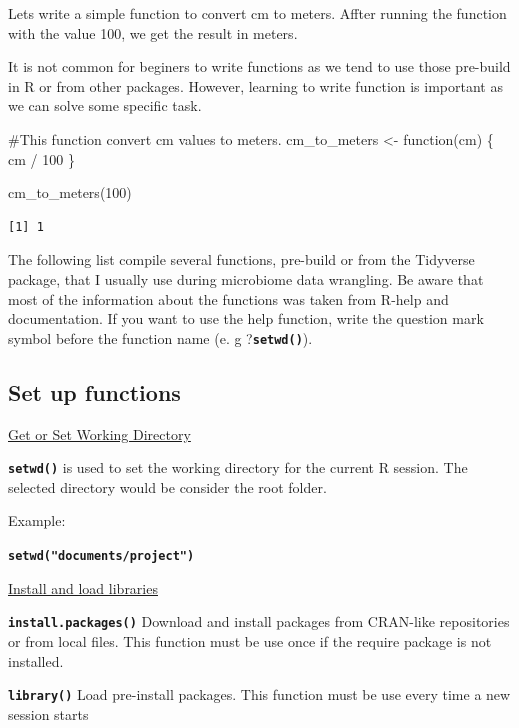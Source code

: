 \documentclass[
  letterpaper,
  DIV=11,
  numbers=noendperiod]{scrartcl}
\newenvironment{Shaded}{\begin{snugshade}}{\end{snugshade}}
\newcommand{\CommentTok}[1]{\textcolor[rgb]{0.37,0.37,0.37}{#1}}
\newcommand{\ControlFlowTok}[1]{\textcolor[rgb]{0.00,0.23,0.31}{#1}}
\newcommand{\DecValTok}[1]{\textcolor[rgb]{0.68,0.00,0.00}{#1}}
\newcommand{\FunctionTok}[1]{\textcolor[rgb]{0.28,0.35,0.67}{#1}}
\newcommand{\NormalTok}[1]{\textcolor[rgb]{0.00,0.23,0.31}{#1}}
\newcommand{\OtherTok}[1]{\textcolor[rgb]{0.00,0.23,0.31}{#1}}
\newcommand{\SpecialCharTok}[1]{\textcolor[rgb]{0.37,0.37,0.37}{#1}}
\begin{document}
Lets write a simple function to convert cm to meters. Affter running the
function with the value 100, we get the result in meters.

It is not common for beginers to write functions as we tend to use those
pre-build in R or from other packages. However, learning to write
function is important as we can solve some specific task.

\begin{Shaded}
\begin{Highlighting}[]
\CommentTok{\#This function convert cm values to meters.}
\NormalTok{cm\_to\_meters }\OtherTok{\textless{}{-}} \ControlFlowTok{function}\NormalTok{(cm) \{ }
\NormalTok{  cm }\SpecialCharTok{/} \DecValTok{100}
\NormalTok{\}}

\FunctionTok{cm\_to\_meters}\NormalTok{(}\DecValTok{100}\NormalTok{)}
\end{Highlighting}
\end{Shaded}

\begin{verbatim}
[1] 1
\end{verbatim}

The following list compile several functions, pre-build or from the
Tidyverse package, that I usually use during microbiome data wrangling.
Be aware that most of the information about the functions was taken from
R-help and documentation. If you want to use the help function, write
the question mark symbol before the function name (e. g
?\textbf{\texttt{setwd()}}).

\hypertarget{set-up-functions}{%
\subsection{Set up functions}\label{set-up-functions}}

\ul{Get or Set Working Directory}

\textbf{\texttt{setwd()}} is used to set the working directory for the
current R session. The selected directory would be consider the root
folder.

Example:

\textbf{\texttt{setwd("documents/project")}}

\ul{Install and load libraries}

\textbf{\texttt{install.packages()}} Download and install packages from
CRAN-like repositories or from local files. This function must be use
once if the require package is not installed.

\textbf{\texttt{library()}} Load pre-install packages. This function
must be use every time a new session starts
\end{document}
